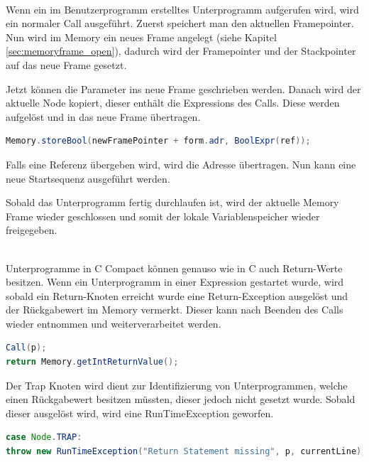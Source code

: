 \\
Wenn ein im Benutzerprogramm erstelltes Unterprogramm aufgerufen wird, wird ein normaler Call ausgeführt. Zuerst speichert man den aktuellen Framepointer. Nun wird im Memory ein neues Frame angelegt (siehe Kapitel \ref{sec:memoryframe_open}), dadurch wird der Framepointer und der Stackpointer auf das neue Frame gesetzt.

Jetzt können die Parameter ins neue Frame geschrieben werden. Danach wird der aktuelle Node kopiert, dieser enthält die Expressions des Calls. Diese werden aufgelöst und in das neue Frame übertragen. 
\begin{lstlisting}[language=JAVA]
Memory.storeBool(newFramePointer + form.adr, BoolExpr(ref));
\end{lstlisting}
Falls eine Referenz übergeben wird, wird die Adresse übertragen. Nun kann eine neue Startsequenz ausgeführt werden.

Sobald das Unterprogramm fertig durchlaufen ist, wird der aktuelle Memory Frame wieder geschlossen und somit der lokale Variablenspeicher wieder freigegeben.

\\
Unterprogramme in C Compact können genauso wie in C auch Return-Werte besitzen. Wenn ein Unterprogramm in einer Expression gestartet wurde, wird sobald ein Return-Knoten erreicht wurde eine Return-Exception ausgelöst und der Rückgabewert im Memory vermerkt. Dieser kann nach Beenden des Calls wieder entnommen und weiterverarbeitet werden.
\begin{lstlisting}[language=JAVA]
Call(p);
return Memory.getIntReturnValue();	
\end{lstlisting}

Der Trap Knoten wird dient zur Identifizierung von Unterprogrammen, welche einen Rückgabewert besitzen müssten, dieser jedoch nicht gesetzt wurde. Sobald dieser ausgelöst wird, wird eine RunTimeException geworfen.
\begin{lstlisting}[language=JAVA]
case Node.TRAP:
throw new RunTimeException("Return Statement missing", p, currentLine); 
\end{lstlisting}
